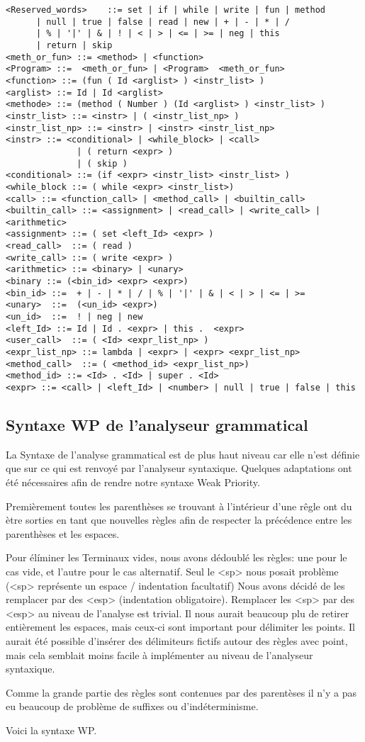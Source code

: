 \begin{verbatim}
<Reserved_words>    ::= set | if | while | write | fun | method 
      | null | true | false | read | new | + | - | * | / 
      | % | '|' | & | ! | < | > | <= | >= | neg | this 
      | return | skip
<meth_or_fun> ::= <method> | <function>
<Program> ::=  <meth_or_fun> | <Program>  <meth_or_fun>
<function> ::= (fun ( Id <arglist> ) <instr_list> ) 
<arglist> ::= Id | Id <arglist>
<methode> ::= (method ( Number ) (Id <arglist> ) <instr_list> )
<instr_list> ::= <instr> | ( <instr_list_np> ) 
<instr_list_np> ::= <instr> | <instr> <instr_list_np>
<instr> ::= <conditional> | <while_block> | <call> 
			  | ( return <expr> ) 
			  | ( skip )
<conditional> ::= (if <expr> <instr_list> <instr_list> ) 
<while_block ::= ( while <expr> <instr_list>) 
<call> ::= <function_call> | <method_call> | <builtin_call> 
<builtin_call> ::= <assignment> | <read_call> | <write_call> | <arithmetic>
<assignment> ::= ( set <left_Id> <expr> ) 
<read_call>  ::= ( read ) 
<write_call> ::= ( write <expr> )
<arithmetic> ::= <binary> | <unary>
<binary ::= (<bin_id> <expr> <expr>)
<bin_id> ::=  + | - | * | / | % | '|' | & | < | > | <= | >=
<unary>  ::=  (<un_id> <expr>)
<un_id>  ::=  ! | neg | new
<left_Id> ::= Id | Id . <expr> | this .  <expr>
<user_call>  ::= ( <Id> <expr_list_np> )
<expr_list_np> ::= lambda | <expr> | <expr> <expr_list_np>
<method_call>  ::= ( <method_id> <expr_list_np>)
<method_id> ::= <Id> . <Id> | super . <Id> 
<expr> ::= <call> | <left_Id> | <number> | null | true | false | this  
\end{verbatim}


\subsection{Syntaxe WP de l'analyseur grammatical}
La Syntaxe de l'analyse grammatical est de plus haut niveau car elle n'est définie que sur ce qui
est renvoyé par l'analyseur syntaxique. Quelques adaptations ont été nécessaires afin de rendre
notre syntaxe Weak Priority. 

Premièrement toutes les parenthèses se trouvant à l'intérieur d'une rêgle ont du ètre sorties en
tant que nouvelles règles afin de respecter la précédence entre les parenthèses et les espaces.  

Pour élíminer les Terminaux vides, nous avons dédoublé les règles: une pour le cas vide, et l'autre
pour le cas alternatif. Seul le <sp> nous posait problème (<sp> représente un espace / indentation facultatif)
Nous avons décidé de les remplacer par des <esp> (indentation obligatoire). Remplacer les <sp> par des <esp> au
niveau de l'analyse est trivial. Il nous aurait beaucoup plu de retirer entièrement les espaces, mais ceux-ci
sont important pour délimiter les points. Il aurait été possible d'insérer des délimiteurs fictifs autour
des règles avec point, mais cela semblait moins facile à implémenter au niveau de l'analyseur syntaxique. 

Comme la grande partie des règles sont contenues par des parentèses il n'y a pas eu beaucoup de problème de suffixes
ou d'indéterminisme. 

Voici la syntaxe WP. 
